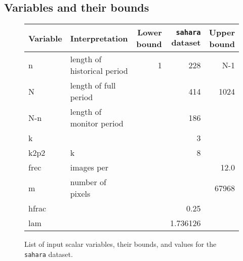     

\subsection{Variables and their bounds}

\begin{figure}[H]
    \centering
    \begin{tabular}{l l r r r}
        Variable & Interpretation              & Lower bound & \texttt{sahara} dataset & Upper bound \\ \hline
        n        & length of historical period & 1           & 228                     & N-1 \\
        N        & length of full period       &             & 414                     & 1024   \\
        N-n      & length of monitor period    &             & 186                     & \\
        k        &                             &             & 3                       & \\
        k2p2     & k\times2                    &             & 8                       & \\
        frec     & images per                  &             &                         & 12.0  \\
        m        & number of pixels            &             &                         & 67968 \\
        hfrac    &                             &             & 0.25                    & \\
        lam      &                             &             & 1.736126                & 
    \end{tabular}
    \caption{List of input scalar variables, their bounds, and values for the
    \texttt{sahara} dataset.}
    \label{tbl:scalars}
\end{figure}








